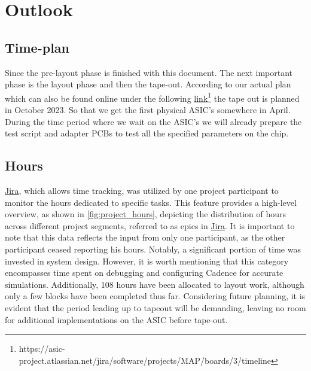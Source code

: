 \section{Outlook}
\label{chap:outlook}
\subsection{Time-plan}
Since the pre-layout phase is finished with this document. The next important phase is the layout phase and then the tape-out. According to our actual plan which can also be found online under the following \href{https://asic-project.atlassian.net/jira/software/projects/MAP/boards/3/timeline}{link}\footnote{https://asic-project.atlassian.net/jira/software/projects/MAP/boards/3/timeline} the tape out is planned in October 2023. So that we get the first physical \ac{ASIC}'s somewhere in April. During the time period where we wait on the \ac{ASIC}'s we will already prepare the test script and adapter PCBs to test all the specified parameters on the chip.
\subsection{Hours}
\href{subsec:jira}{Jira}, which allows time tracking, was utilized by one project participant to monitor the hours dedicated to specific tasks. This feature provides a high-level overview, as shown in  \autoref{fig:project_hours}, depicting the distribution of hours across different project segments, referred to as epics in \href{subsec:jira}{Jira}. It is important to note that this data reflects the input from only one participant, as the other participant ceased reporting his hours. Notably, a significant portion of time was invested in system design. However, it is worth mentioning that this category encompasses time spent on debugging and configuring Cadence for accurate simulations. Additionally, 108 hours have been allocated to layout work, although only a few blocks have been completed thus far. Considering future planning, it is evident that the period leading up to tapeout will be demanding, leaving no room for additional implementations on the ASIC before tape-out.
\clearpage